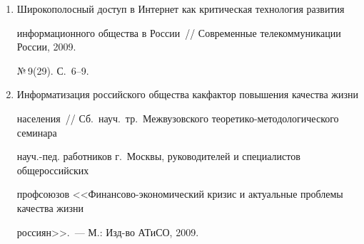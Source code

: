\begin{enumerate}[1.]
Информатизация общества и социальная информатика~// Вестник Челябинской 


гос.\ акад.\ культуры и искусств, 2009. №\,3(19). С.~6--14.





\item {}


Широкополосный доступ в Интернет как критическая технология  развития 


информационного общества в России~// Современные телекоммуникации России, 2009. 


№\,9(29). С.~6--9.



























\item {}


Информатизация российского общества как\linebreak фактор повышения качества жизни 


населения~// Сб.\ науч.\ тр.\ Межвузовского тео\-ре\-ти\-ко-ме\-то\-до\-ло\-ги\-че\-ско\-го семинара 


науч.-пед. работников г.~Москвы, руководителей и специалистов общероссийских 


профсоюзов <<Финансово-эко\-но\-ми\-че\-ский кризис и актуальные проблемы качества жизни 


россиян>>.~--- М.: Изд-во АТиСО, 2009.


\end{enumerate}





